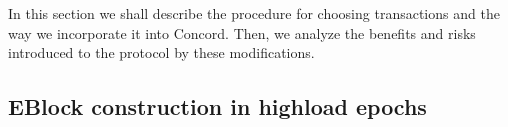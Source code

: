 In this section we shall describe the procedure for choosing transactions and the way we incorporate it into Concord. Then, we analyze the benefits and risks introduced to the protocol by these modifications.

\subsection{EBlock construction in highload epochs}




